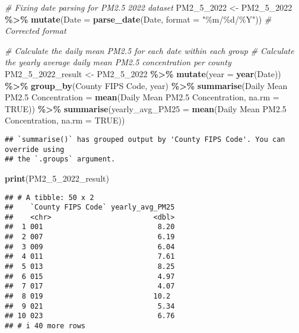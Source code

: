 \documentclass[
]{article}
\newenvironment{Shaded}{\begin{snugshade}}{\end{snugshade}}
\newcommand{\AttributeTok}[1]{\textcolor[rgb]{0.13,0.29,0.53}{#1}}
\newcommand{\CommentTok}[1]{\textcolor[rgb]{0.56,0.35,0.01}{\textit{#1}}}
\newcommand{\ConstantTok}[1]{\textcolor[rgb]{0.56,0.35,0.01}{#1}}
\newcommand{\FunctionTok}[1]{\textcolor[rgb]{0.13,0.29,0.53}{\textbf{#1}}}
\newcommand{\NormalTok}[1]{#1}
\newcommand{\OtherTok}[1]{\textcolor[rgb]{0.56,0.35,0.01}{#1}}
\newcommand{\SpecialCharTok}[1]{\textcolor[rgb]{0.81,0.36,0.00}{\textbf{#1}}}
\newcommand{\StringTok}[1]{\textcolor[rgb]{0.31,0.60,0.02}{#1}}
\begin{document}
\begin{Shaded}
\begin{Highlighting}[]
\CommentTok{\# Fixing date parsing for PM2.5 2022 dataset}
\NormalTok{PM2\_5\_2022 }\OtherTok{\textless{}{-}}\NormalTok{ PM2\_5\_2022 }\SpecialCharTok{\%\textgreater{}\%}
  \FunctionTok{mutate}\NormalTok{(}\AttributeTok{Date =} \FunctionTok{parse\_date}\NormalTok{(Date, }\AttributeTok{format =} \StringTok{"\%m/\%d/\%Y"}\NormalTok{)) }\CommentTok{\# Corrected format}

\CommentTok{\# Calculate the daily mean PM2.5 for each date within each group}
\CommentTok{\# Calculate the yearly average daily mean PM2.5 concentration per county}
\NormalTok{PM2\_5\_2022\_result }\OtherTok{\textless{}{-}}\NormalTok{ PM2\_5\_2022 }\SpecialCharTok{\%\textgreater{}\%}
  \FunctionTok{mutate}\NormalTok{(}\AttributeTok{year =} \FunctionTok{year}\NormalTok{(Date)) }\SpecialCharTok{\%\textgreater{}\%}
  \FunctionTok{group\_by}\NormalTok{(}\StringTok{\textasciigrave{}}\AttributeTok{County FIPS Code}\StringTok{\textasciigrave{}}\NormalTok{, year) }\SpecialCharTok{\%\textgreater{}\%}
  \FunctionTok{summarise}\NormalTok{(}\StringTok{\textasciigrave{}}\AttributeTok{Daily Mean PM2.5 Concentration}\StringTok{\textasciigrave{}} \OtherTok{=} \FunctionTok{mean}\NormalTok{(}\StringTok{\textasciigrave{}}\AttributeTok{Daily Mean PM2.5 Concentration}\StringTok{\textasciigrave{}}\NormalTok{, }\AttributeTok{na.rm =} \ConstantTok{TRUE}\NormalTok{)) }\SpecialCharTok{\%\textgreater{}\%}
  \FunctionTok{summarise}\NormalTok{(}\AttributeTok{yearly\_avg\_PM25 =} \FunctionTok{mean}\NormalTok{(}\StringTok{\textasciigrave{}}\AttributeTok{Daily Mean PM2.5 Concentration}\StringTok{\textasciigrave{}}\NormalTok{, }\AttributeTok{na.rm =} \ConstantTok{TRUE}\NormalTok{))}
\end{Highlighting}
\end{Shaded}

\begin{verbatim}
## `summarise()` has grouped output by 'County FIPS Code'. You can override using
## the `.groups` argument.
\end{verbatim}

\begin{Shaded}
\begin{Highlighting}[]
\FunctionTok{print}\NormalTok{(PM2\_5\_2022\_result)}
\end{Highlighting}
\end{Shaded}

\begin{verbatim}
## # A tibble: 50 x 2
##    `County FIPS Code` yearly_avg_PM25
##    <chr>                        <dbl>
##  1 001                           8.20
##  2 007                           6.19
##  3 009                           6.04
##  4 011                           7.61
##  5 013                           8.25
##  6 015                           4.97
##  7 017                           4.07
##  8 019                          10.2 
##  9 021                           5.34
## 10 023                           6.76
## # i 40 more rows
\end{verbatim}
\end{document}
